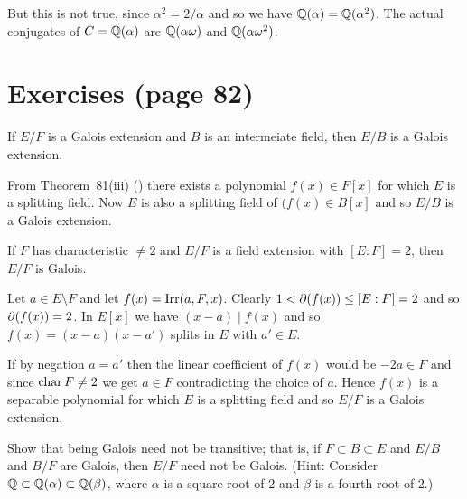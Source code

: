 But this is not true, since \(\alpha^2=2/\alpha\) and so
we have \(\mathbb{Q}(\alpha)=\mathbb{Q}(\alpha^2)\).
The actual conjugates of \(C=\mathbb{Q}(\alpha)\)
are  \(\mathbb{Q}(\alpha\omega)\)
and  \(\mathbb{Q}(\alpha\omega^2)\).

\section{Exercises (page 82)}

\begin{myenumerate} %

\item
\begin{excopy}
If \(E/F\) is a Galois extension and $B$ is an intermeiate field,
then \(E/B\) is a Galois extension.
\end{excopy}

From Theorem~81(iii) (\cite{Rotman98}) there exists a polynomial
\(f(x)\in F[x]\) for which $E$ is a splitting field.
Now $E$ is also a splitting field of \((f(x)\in B[x]\) and so
\(E/B\) is a Galois extension.

\item
\begin{excopy}
If $F$ has characteristic \(\neq 2\) and \(E/F\) is a field extension
with \([E:F]=2\), then \(E/F\) is Galois.
\end{excopy}

Let \(a\in E\setminus F\) and let \(f(x)=\mathop{\rm Irr}\nolimits(a,F,x)\).
Clearly \(1<\partial(f(x))\leq [E:F]=2\) and so \(\partial(f(x))=2\).
In \(E[x]\) we have \((x-a)\mid f(x)\) and so \(f(x)=(x-a)(x-a')\)
splits in $E$ with \(a'\in E\).

If by negation \(a=a'\) then the linear coefficient of \(f(x)\)
would be \(-2a \in F\) and since \(\mathop{\rm char}\nolimits F\neq2\)
we get \(a\in F\)  contradicting the choice of $a$.
Hence \(f(x)\) is a separable polynomial for which $E$ is a splitting field
and so \(E/F\) is a Galois extension.

\item
\begin{excopy}
Show that being Galois need not be transitive; that is,
if \(F\subset B\subset E\) and \(E/B\) and \(B/F\) are Galois, then
\(E/F\) need not be Galois.
(Hint: Consider \(\mathbb{Q} \subset \mathbb{Q}(\alpha) \subset \mathbb{Q}(\beta)\),
where \(\alpha\) is a square root of $2$
and \(\beta\) is a fourth root of $2$.)
\end{excopy}


\end{myenumerate}
